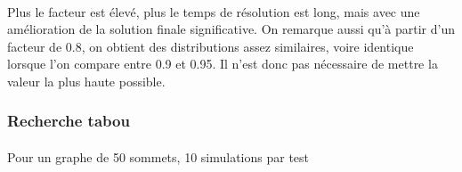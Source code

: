\documentclass[12pt]{article}
\begin{document}
\paragraph{}Plus le facteur est élevé, plus le temps de résolution est long, mais avec une amélioration de la solution finale significative. On remarque aussi qu'à partir d'un facteur de 0.8, on obtient des distributions assez similaires, voire identique lorsque l'on compare entre 0.9 et 0.95. Il n'est donc pas nécessaire de mettre la valeur la plus haute possible.

\subsubsection{Recherche tabou}

\paragraph{}Pour un graphe de 50 sommets, 10 simulations par test
\end{document}
